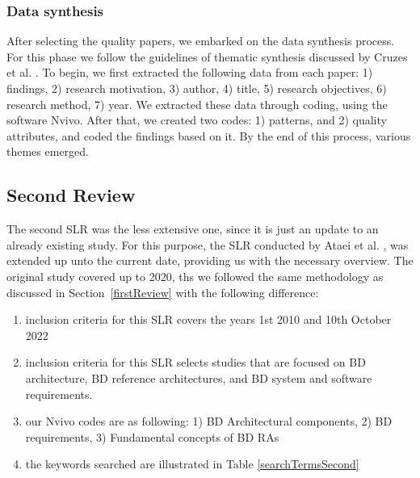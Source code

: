 \documentclass{bmcart}
\begin{document}
\subsubsection{Data synthesis}

After selecting the quality papers, we embarked on the data synthesis process. For this phase we follow the guidelines of thematic synthesis discussed by Cruzes et al. \cite{Cruzes.2011}. To begin, we first extracted the following data from each paper: 1) findings, 2) research motivation, 3) author, 4) title, 5) research objectives, 6) research method, 7) year. We extracted these data through coding, using the software Nvivo. After that, we created two codes: 1) patterns, and 2) quality attributes, and coded the findings based on it. By the end of this process, various themes emerged.



 



\subsection{Second Review} \label{secondReview}

The second SLR was the less extensive one, since it is just an update to an already existing study. For this purpose, the SLR conducted by Ataei et al. \cite{Ataei.2020}, was extended up unto the current date, providing us with the necessary overview. The original study covered up to 2020, ths we followed the same methodology as discussed in Section~\ref{firstReview} with the following difference: 

\begin{enumerate}
  \item inclusion criteria for this SLR covers the years 1st 2010 and 10th October 2022 
  \item inclusion criteria for this SLR selects studies that are focused on BD architecture, BD reference architectures, and BD system and software requirements.
  \item our Nvivo codes are as following: 1) BD Architectural components, 2) BD requirements, 3) Fundamental concepts of BD RAs
  \item the keywords searched are illustrated in Table \ref{searchTermsSecond}
\end{enumerate}
\end{document}
